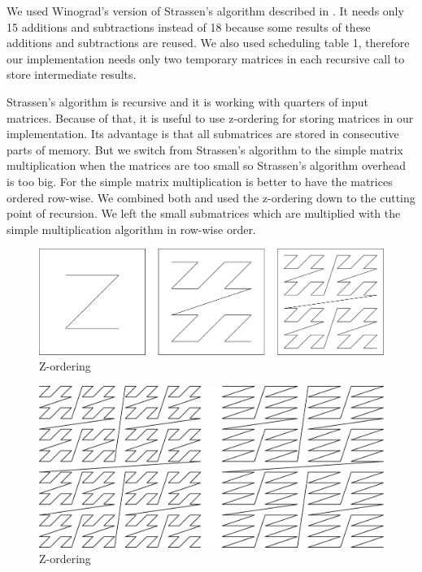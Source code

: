 \documentclass{article}
\begin{document}
We used Winograd's version of Strassen’s algorithm described in \cite{boyer2009memory}.
It needs only 15 additions and subtractions instead of 18 because some results of 
these additions and subtractions are reused. We also used scheduling table 1, 
therefore our implementation needs only two temporary matrices in each recursive call
to store intermediate results.

Strassen’s algorithm is recursive and it is working with quarters of input matrices.
Because of that, it is useful to use z-ordering for storing matrices in our implementation.
Its advantage is that all submatrices are stored in consecutive parts of memory.
But we switch from Strassen’s algorithm to the simple matrix multiplication
when the matrices are too small so Strassen’s algorithm overhead is too big.
For the simple matrix multiplication is better to have the matrices ordered row-wise.
We combined both and used the z-ordering down to the cutting point of recursion.
We left the small submatrices which are multiplied with the simple multiplication algorithm
in row-wise order. %

\begin{figure}[htbp]
\centerline{\includegraphics[scale=.3]{z_ordering.pdf}}
\caption{Z-ordering}
\label{fig}
\end{figure}

\begin{figure}[htbp]
\centerline{\includegraphics[scale=.3]{partly_z_ordering.pdf}}
\caption{Z-ordering}
\label{fig}
\end{figure}
\end{document}

